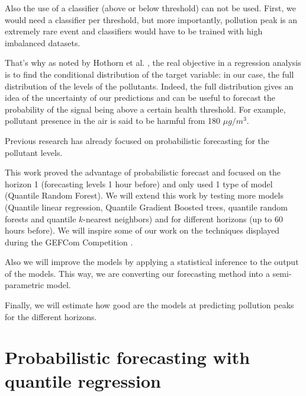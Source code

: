 \documentclass[a4paper,twocolumn,5p]{elsarticle}
\begin{document}
Also the use of a classifier (above or below threshold) can not 
be used. First, we would need a classifier per threshold, but 
more importantly, pollution peak is an extremely rare event and 
classifiers would have to be trained with high imbalanced datasets.

That's why as noted by Hothorn et al. \cite{hothorn_conditional_2014},
the real objective in a regression analysis is to find the conditional
distribution of the target variable: in our case, the full 
distribution of the levels of the pollutants. Indeed, the full
distribution gives an idea of the uncertainty of our predictions and
can be useful to forecast the probability of the signal being above a
certain health threshold.  For example, \no pollutant presence in
the air is said to be harmful from 180 $\mu g / m^3$. 

Previous research \cite{proba_aznarte} has already focused on
probabilistic forecasting for the \no pollutant levels.

This work proved the advantage of probabilistic forecast and focused
on the horizon 1 (forecasting levels 1 hour before) and only used 1
type of model (Quantile Random Forest). We will extend this work by
testing more models (Quantile linear regression, Quantile Gradient 
Boosted
trees, quantile random forests and quantile $k$-nearest neighbors) 
and for different horizons (up to 60 hours
before).  We will inspire some of our work on the techniques displayed
during the GEFCom Competition \cite{mangalova_k-nearest_2016}
\cite{hong_probabilistic_2016}.

Also we will improve the models by applying a statistical
inference to the output of the models. This way, we are converting our
forecasting method into a semi-parametric model.

Finally, we will estimate how good are the models at predicting 
pollution peaks for the different horizons.

\section{Probabilistic forecasting with quantile regression}
\label{sec:probForec}
\end{document}
